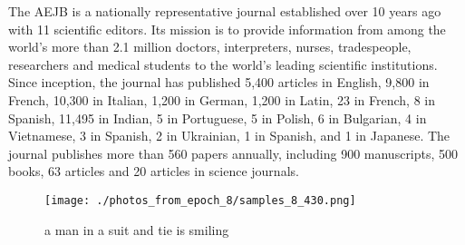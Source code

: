 \documentclass{article}%
\begin{document}
The AEJB is a nationally representative journal established over 10 years ago with 11 scientific editors. Its mission is to provide information from among the world's more than 2.1 million doctors, interpreters, nurses, tradespeople, researchers and medical students to the world's leading scientific institutions. Since inception, the journal has published 5,400 articles in English, 9,800 in French, 10,300 in Italian, 1,200 in German, 1,200 in Latin, 23 in French, 8 in Spanish, 11,495 in Indian, 5 in Portuguese, 5 in Polish, 6 in Bulgarian, 4 in Vietnamese, 3 in Spanish, 2 in Ukrainian, 1 in Spanish, and 1 in Japanese. The journal publishes more than 560 papers annually, including 900 manuscripts, 500 books, 63 articles and 20 articles in science journals.\newline%

%


\begin{figure}[h!]%
\centering%
\texttt{[image: ./photos\_from\_epoch\_8/samples\_8\_430.png]}%
\caption{a man in a suit and tie is smiling}%
\end{figure}

%
\end{document}
